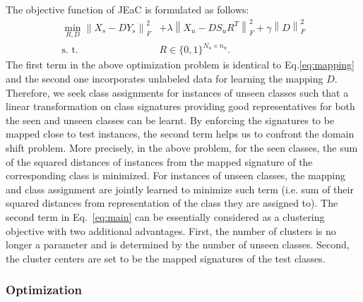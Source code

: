 \documentclass[10pt,twocolumn,letterpaper]{article}
\newcommand{\norm}[1]{\left \lVert #1 \right \rVert_{F}^2}
\DeclareMathOperator*{\minimize}{min}
\begin{document}
The objective function of JEaC is formulated as follows:
 \begin{align} \label{eq:main}
   \minimize_{R,D} \norm{X_s - D Y_s}  &+ \lambda \norm{X_u - D S_u R^T } + \gamma \norm{D} \\
   \text{s. t.} \quad & R \in \{0,1\}^{N_u \times n_u}. \nonumber
 \end{align}
The first term in the above optimization problem is identical to Eq.\eqref{eq:mapping} and the second one incorporates unlabeled data for learning the mapping $D$. Therefore, we seek class assignments for instances of unseen classes such that a linear transformation on class signatures providing good representatives for both the seen and unseen classes can be learnt. By enforcing
 the signatures to be mapped close to test instances, the second term helps us to confront the domain shift problem.
More precisely, in the above problem, for the seen classes, the sum of the squared distances of instances from the
 mapped signature of the corresponding class is minimized. For instances of unseen classes,
 the mapping and class assignment are jointly learned to minimize such term (i.e. sum of their squared distances from representation of the class they are assigned to).
  The second term in Eq.~\ref{eq:main} can be essentially considered as a clustering objective with two
  additional advantages. First, the number of clusters is no longer a parameter and is determined by the number of unseen classes.
   Second, the cluster centers are set to be the mapped signatures of the test classes.

\subsubsection{Optimization} \label{optimization}
\end{document}
